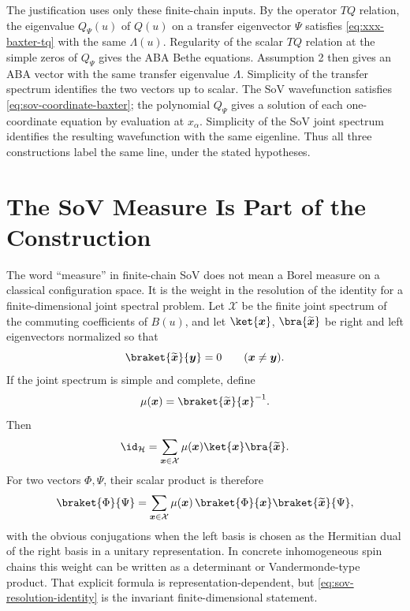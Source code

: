 The justification uses only these finite-chain inputs.  By the operator
\(TQ\) relation, the eigenvalue \(Q_\Psi(u)\) of \(Q(u)\) on a
transfer eigenvector \(\Psi\) satisfies \eqref{eq:xxx-baxter-tq} with the
same \(\Lambda(u)\).  Regularity of the scalar \(TQ\) relation at the simple
zeros of \(Q_\Psi\) gives the ABA Bethe equations.
Assumption 2 then gives an ABA vector with the same transfer eigenvalue
\(\Lambda\).  Simplicity of the transfer spectrum identifies the two vectors
up to scalar.  The SoV wavefunction satisfies
\eqref{eq:sov-coordinate-baxter}; the polynomial \(Q_\Psi\) gives a solution
of each one-coordinate equation by evaluation at \(x_\alpha\).  Simplicity of
the SoV joint spectrum identifies the resulting wavefunction with the same
eigenline.  Thus all three constructions label the same line, under the
stated hypotheses.

\section{The SoV Measure Is Part of the Construction}

The word ``measure'' in finite-chain SoV does not mean a Borel measure on a
classical configuration space.  It is the weight in the resolution of the
identity for a finite-dimensional joint spectral problem.  Let
\(\mathcal X\) be the finite joint spectrum of the commuting coefficients of
\(B(u)\), and let \(\ket{\boldsymbol x}\),
\(\bra{\widetilde{\boldsymbol x}}\) be right and left eigenvectors normalized
so that
\[
  \braket{\widetilde{\boldsymbol x}}{\boldsymbol y}=0
  \qquad(\boldsymbol x\ne\boldsymbol y).
\]
If the joint spectrum is simple and complete, define
\[
  \mu(\boldsymbol x)
  =
  \braket{\widetilde{\boldsymbol x}}{\boldsymbol x}^{-1}.
\]
Then
\begin{equation}
  \id_{\mathcal H}
  =
  \sum_{\boldsymbol x\in\mathcal X}
  \mu(\boldsymbol x)
  \ket{\boldsymbol x}\bra{\widetilde{\boldsymbol x}} .
  \label{eq:sov-resolution-identity}
\end{equation}
For two vectors \(\Phi,\Psi\), their scalar product is therefore
\[
  \braket{\Phi}{\Psi}
  =
  \sum_{\boldsymbol x\in\mathcal X}
  \mu(\boldsymbol x)\,
  \braket{\Phi}{\boldsymbol x}
  \braket{\widetilde{\boldsymbol x}}{\Psi},
\]
with the obvious conjugations when the left basis is chosen as the Hermitian
dual of the right basis in a unitary representation.  In concrete
inhomogeneous spin chains this weight can be written as a determinant or
Vandermonde-type product.  That explicit formula is representation-dependent,
but \eqref{eq:sov-resolution-identity} is the invariant finite-dimensional
statement.

